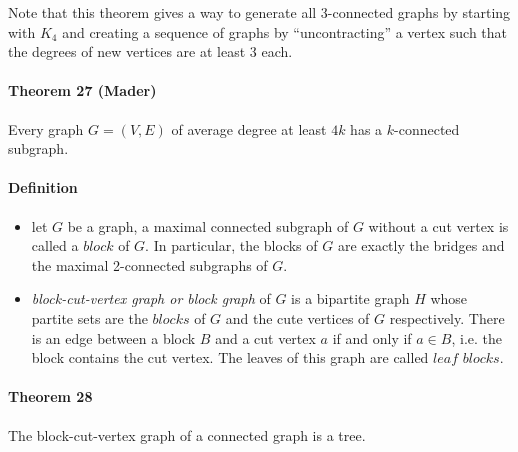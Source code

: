 Note that this theorem gives a way to generate all 3-connected graphs by starting with 
$K_4$ and creating a sequence of graphs by \enquote{uncontracting} a vertex such that 
the degrees of new vertices are at least 3 each.


\paragraph{Theorem 27 (Mader)} Every graph $ G = (V,E) $ of average degree at least $4k$
has a $k$-connected subgraph.


\paragraph{Definition}
\begin{itemize}
    \item let $ G $ be a graph, a maximal connected subgraph of $ G $ without a 
    cut vertex is called a $block$ of $ G$. In particular, the blocks of $ G $ 
    are exactly the bridges and the maximal 2-connected subgraphs of $ G$.
    \item \textit{block-cut-vertex graph or block graph} of $ G $ is a bipartite
    graph $ H $ whose partite sets are the $blocks$ of $ G $ and the cute vertices
    of $ G $ respectively. There is an edge between a block $ B $ and a cut vertex 
    $ a $ if and only if $ a \in B $, i.e. the block contains the cut vertex. The 
    leaves of this graph are called $leaf$ $blocks$.
\end{itemize}

\paragraph{Theorem 28} The block-cut-vertex graph of a connected graph is a tree.